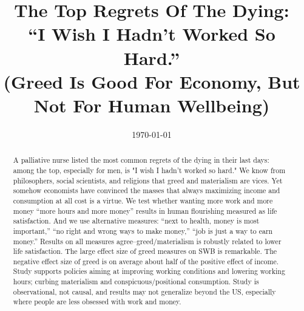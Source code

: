 \documentclass[10pt, letterpaper]{article}
\date{{}\today \hspace{.2in}\xxivtime}
\title{The Top Regrets Of The Dying:\\ ``I Wish I Hadn't Worked So Hard.''\\
  (Greed Is Good For Economy, But Not For Human Wellbeing) %
}
\author{
}
\begin{document}


\maketitle
\vspace{-.4in}
\begin{center}

\end{center}


\begin{abstract}
\noindent A palliative nurse listed the most common regrets of the dying in
their last days: among the top, especially for men, is "I wish I hadn't worked so hard." We know from philosophers, social scientists, and religions that greed and materialism are vices. Yet somehow %
economists have convinced the masses that always maximizing income and
consumption at all cost is a virtue.
%
We test whether wanting more work and more money ``more hours and more money'' results in human flourishing measured as life satisfaction. And we use alternative measures: ``next to health,
money is most important,'' ``no right and wrong ways to make money,'' ``job is
just a way to earn money.'' Results on all measures agree--greed/materialism is
robustly related to lower life satisfaction.
%
The large effect size of greed measures on SWB is remarkable. The negative effect size of
greed is on average about half of the positive effect of income.
%
Study supports policies aiming at
improving working conditions and lowering working hours; curbing materialism and
conspicuous/positional consumption. 
%
Study is observational, not causal, and results may not generalize beyond the US, especially where people are less obsessed with work and money.  
\end{abstract}
\vspace{.15in} 
\vspace{.25in} 
\end{document}
